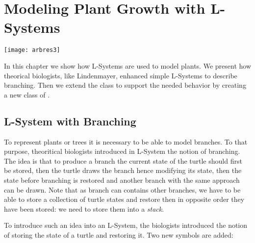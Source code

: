 \ifx\wholebook\relax\else



\fi


\project
\chapter{Modeling Plant Growth with L-Systems}\label{ch:plant}

\begin{chapterfigure}
\texttt{[image: arbres3]}
\end{chapterfigure}


In this chapter we show how L-Systems are used to model plants.  We
present how theorical biologists, like Lindenmayer, enhanced simple
L-Systems to describe branching. Then we extend the  class
to support the needed behavior by creating a new class of .

\section{L-System with Branching}
To represent plants or trees it is necessary to be able to model
branches. To that purpose, theoritical biologists introduced in
L-System the notion of branching. The idea is that to produce a branch
the current state of the turtle should first be stored, then the
turtle draws the branch hence modifying its state, then the state
before branching is restored and another branch with the same approach
can be drawn. Note that as branch can contains other branches, we have
to be able to store a collection of turtle states and restore then in
opposite order they have been stored: we need to store them into a
\emph{stack}.

To introduce such an idea into an L-System, the biologists introduced
the notion of storing the state of a turtle and restoring it.  Two new
symbols are added:

